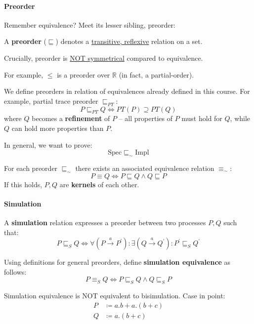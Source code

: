 \documentclass[99-notes-packed.tex]{subfiles}
\begin{document}
\paragraph*{Preorder}
Remember equivalence? Meet its lesser sibling, preorder: 

\begin{definition}[Preorder]
    A \textbf{preorder} ($\sqsubseteq$) denotes a \underline{transitive, reflexive} relation on a set. 
    
    Crucially, preorder is \underline{NOT symmetrical} compared to equivalence. 

    For example, $\le$ is a preorder over $\mathbb{R}$ (in fact, a partial-order).
\end{definition}

We define preorders in relation of equivalences already defined in this course. For example, partial trace preorder $\sqsubseteq_{PT}$: 
\begin{equation*}
    P \sqsubseteq_{PT} Q \iff PT(P) \supseteq PT(Q)
\end{equation*}
where $Q$ becomes a \textbf{refinement} of $P$ -- all properties of $P$ must hold for $Q$, while $Q$ can hold more properties than $P$. 

In general, we want to prove: 
\begin{equation*}
    \mathrm{Spec} \sqsubseteq_{\sim} \mathrm{Impl}
\end{equation*}

\begin{definition}[Kernel]
    For each preorder $\sqsubseteq_{\sim}$ there exists an associated equivalence relation $\equiv_{\sim}$: 
    \begin{equation*}
        P \equiv Q \iff P \sqsubseteq Q \wedge Q \sqsubseteq P
    \end{equation*}
    If this holds, $P, Q$ are \textbf{kernels} of each other.
\end{definition}

\paragraph*{Simulation}
A \textbf{simulation} relation expresses a preorder between two processes $P, Q$ such that: 
\begin{equation*}
    P \sqsubseteq_{S} Q \iff \forall (P \xrightarrow{a} P^{'}): \exists (Q \xrightarrow{a} Q^{'}): P^{'} \sqsubseteq_{S} Q^{'}
\end{equation*}

Using definitions for general preorders, define \textbf{simulation equivalence} as follows: 
\begin{equation*}
    P \equiv_{S} Q \iff P \sqsubseteq_{S} Q \wedge Q \sqsubseteq_{S} P 
\end{equation*}

\begin{example}[$\equiv_{S}$ vs. $=_{B}$]
    Simulation equivalence is NOT equivalent to bisimulation. Case in point: 
    \begin{align*}
        P &\coloneqq a.b + a.(b + c) \\
        Q &\coloneqq a.(b + c)
    \end{align*}
\end{example}
\end{document}

